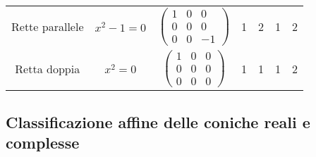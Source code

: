 \begin{tabular}{|c|c|c|c|c|c|c|}
  Rette parallele&$x^2-1=0$&$\left(\begin{smallmatrix} 1 & 0 & 0 \\ 0 & 0 & 0 \\ 0 & 0 & -1 \end{smallmatrix}\right)$&1&2&1&2\\
  Retta doppia&$x^2=0$&$\left(\begin{smallmatrix} 1 & 0 & 0 \\ 0 & 0 & 0 \\ 0 & 0 & 0 \end{smallmatrix}\right)$&1&1&1&2\\
  \hline
 \end{tabular}
 
 \subsection{Classificazione affine delle coniche reali e complesse}

